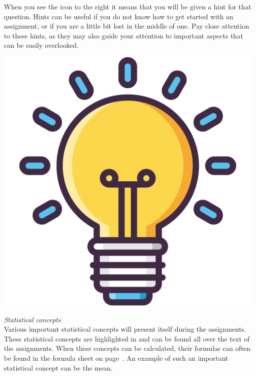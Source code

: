 \begin{minipage}{0.85\textwidth}
When you see the icon to the right it means that you will be given a hint for that question. Hints can be useful if you do not know how to get started with an assignment, or if you are a little bit lost in the middle of one. Pay close attention to these hints, as they may also guide your attention to important aspects that can be easily overlooked.
\end{minipage}%
\hfill%
\begin{minipage}{0.1\textwidth}
\includegraphics[width=\linewidth]{Files/Images/lightbulb.pdf}
\end{minipage}

\clearpage %
\thispagestyle{emptyhead}

\textit{Statistical concepts} \\ 

Various important statistical concepts will present itself during the assignments. These statistical concepts are highlighted in  and can be found all over the text of the assignments. When these concepts can be calculated, their formulas can often be found in the formula sheet on page~\pageref{formulasheet}. An example of such an important statistical concept can be the mean. \\

